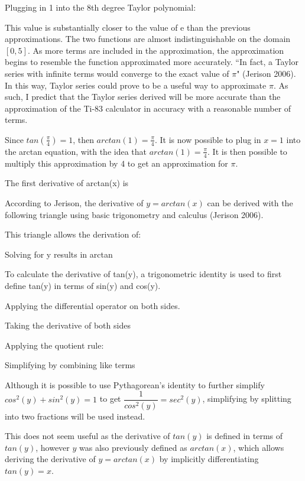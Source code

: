 Plugging in 1 into the 8th degree Taylor polynomial:

This value is substantially closer to the value of e than the previous approximations. The two functions are almost indistinguishable on the domain \([0,5]\). As more terms are included in the approximation, the approximation begins to resemble the function approximated more accurately. ``In fact, a Taylor series with infinite terms would converge to the exact value of \(\pi\)" (Jerison 2006). In this way, Taylor series could prove to be a useful way to approximate \(\pi\). As such, I predict that the Taylor series derived will be more accurate than the approximation of the Ti-83 calculator in accuracy with a reasonable number of terms.

Since \(tan(\frac{\pi}{4}) = 1\), then \(arctan(1)= \frac{\pi}{4}\). It is now possible to plug in \(x = 1\) into the arctan equation, with the idea that \(arctan(1) = \frac{\pi}{4}\). It is then possible to multiply this approximation by 4 to get an approximation for \(\pi\).



The first derivative of arctan(x) is 

According to Jerison, the derivative of \(y = arctan(x)\) can be derived with the following triangle using basic trigonometry and calculus (Jerison 2006).

This triangle allows the derivation of:

Solving for y results in arctan

To calculate the derivative of tan(y), a trigonometric identity is used to first define tan(y) in terms of sin(y) and cos(y).

Applying the differential operator on both sides.

Taking the derivative of both sides

Applying the quotient rule:

Simplifying by combining like terms

Although it is possible to use Pythagorean's identity to further simplify \(cos^{2}(y) + sin^{2}(y) = 1\) to get \(\dfrac{1}{cos^{2}(y)} = sec^{2}(y)\), simplifying by splitting into two fractions will be used instead. 

This does not seem useful as the derivative of \(tan(y)\) is defined in terms of \(tan(y)\), however \(y\) was also previously defined as \(arctan(x)\), which allows deriving the derivative of \(y = arctan(x)\) by implicitly differentiating \(tan(y) = x\).

